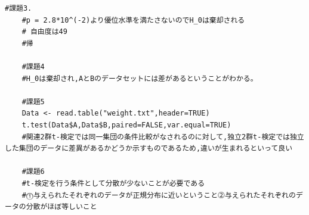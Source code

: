 \documentclass[fontsize = 10pt, paper= a4,twocolumn,column_gap=5zw]{jlreq}
\begin{document}
\begin{lstlisting}[basicstyle=\ttfamily\footnotesize, frame=single, caption=s2212022-1.c ,label=s2212022-1.c]
    #課題3.
    #p = 2.8*10^(-2)より優位水準を満たさないのでH_0は棄却される
    # 自由度は49
    #帰

    #課題4
    #H_0は棄却され,AとBのデータセットには差があるということがわかる。

    #課題5
    Data <- read.table("weight.txt",header=TRUE)
    t.test(Data$A,Data$B,paired=FALSE,var.equal=TRUE)
    #関連2群t-検定では同一集団の条件比較がなされるのに対して,独立2群t-検定では独立した集団のデータに差異があるかどうか示すものであるため,違いが生まれるといって良い

    #課題6
    #t-検定を行う条件として分散が少ないことが必要である
    #⓵与えられたそれぞれのデータが正規分布に近いということ⓶与えられたそれぞれのデータの分散がほぼ等しいこと




    \end{lstlisting}
\end{document}
